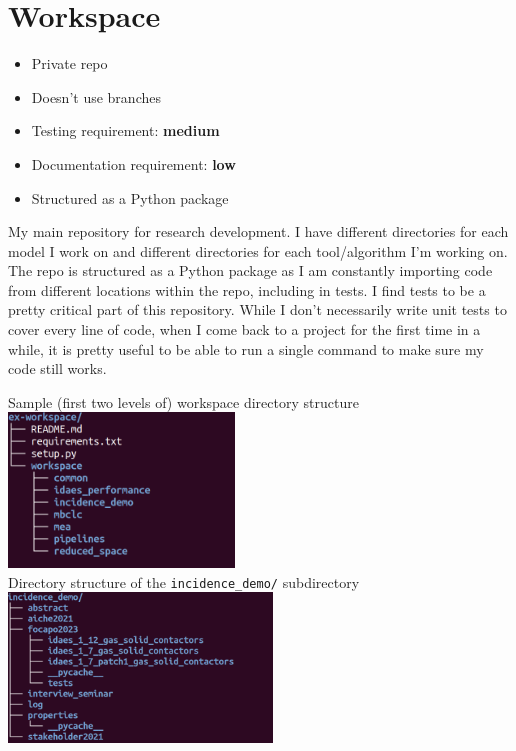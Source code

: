 \documentclass{article}
\begin{document}
\section{Workspace}
\begin{itemize}
  \item Private repo
  \item Doesn't use branches
  \item Testing requirement: {\color{purple}\bf medium}
  \item Documentation requirement: {\color{blue}\bf low}
  \item Structured as a Python package
\end{itemize}
My main repository for research development. I have different
directories for each model I work on and different directories for
each tool/algorithm I'm working on.
The repo is structured as a Python package as I am constantly
importing code from different locations within the repo,
including in tests.
I find tests to be a pretty critical part of this repository. While
I don't necessarily write unit tests to cover every line of code,
when I come back to a project for the first time in a while, it is
pretty useful to be able to run a single command to make sure
my code still works.
\begin{center}
  Sample (first two levels of) workspace directory structure\\
  \includegraphics[width=6cm]{workspace_tree.png}
  \\
  Directory structure of the \texttt{incidence\_demo/} subdirectory
  \includegraphics[width=7cm]{incidence_demo_tree.png}
\end{center}
\end{document}
